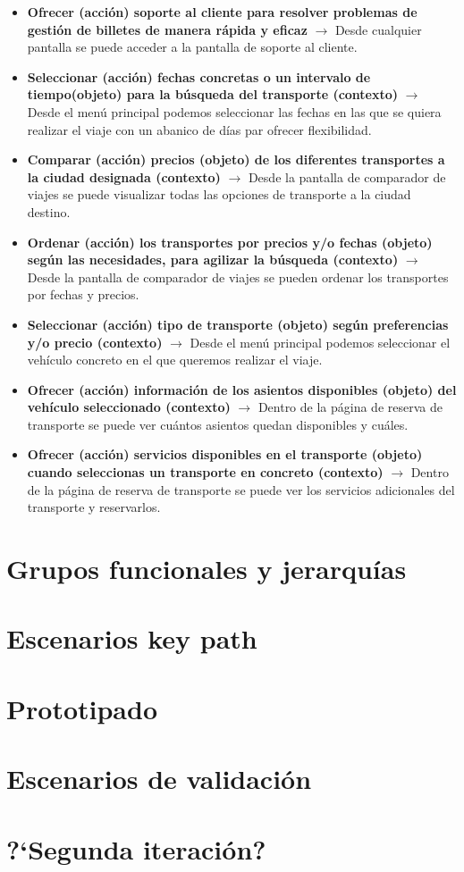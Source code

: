 \begin{itemize}
    \item \textbf{Ofrecer (acción) soporte al cliente para resolver problemas de gestión de billetes de manera rápida y eficaz} $\rightarrow$ Desde cualquier pantalla 
    se puede acceder a la pantalla de soporte al cliente.
    \item \textbf{Seleccionar (acción) fechas concretas o un intervalo de tiempo(objeto) para la búsqueda del transporte (contexto)} $\rightarrow$ Desde el menú 
    principal podemos seleccionar las fechas en las que se quiera realizar el viaje con un abanico de días par ofrecer flexibilidad.
    \item \textbf{Comparar (acción) precios (objeto) de los diferentes transportes a la ciudad designada (contexto)} $\rightarrow$ Desde la pantalla de comparador 
    de viajes se puede visualizar todas las opciones de transporte a la ciudad destino.
    \item \textbf{Ordenar (acción) los transportes por precios y/o fechas (objeto) según las necesidades, para agilizar la búsqueda (contexto)} $\rightarrow$ Desde 
    la pantalla de comparador de viajes se pueden ordenar los transportes por fechas y precios.
    \item \textbf{Seleccionar (acción) tipo de transporte (objeto) según preferencias y/o precio (contexto)} $\rightarrow$ Desde el menú principal podemos seleccionar 
    el vehículo concreto en el que queremos realizar el viaje.
    \item \textbf{Ofrecer (acción) información de los asientos disponibles (objeto) del vehículo seleccionado (contexto)} $\rightarrow$ Dentro de la página de 
    reserva de transporte se puede ver cuántos asientos quedan disponibles y cuáles.
    \item \textbf{Ofrecer (acción) servicios disponibles en el transporte (objeto) cuando seleccionas un transporte en concreto (contexto)} $\rightarrow$ Dentro de 
    la página de reserva de transporte se puede ver los servicios adicionales del transporte y reservarlos.
\end{itemize}

\section{Grupos funcionales y jerarquías}

\section{Escenarios key path}

\section{Prototipado}

\section{Escenarios de validación}

\section{?`Segunda iteración?}